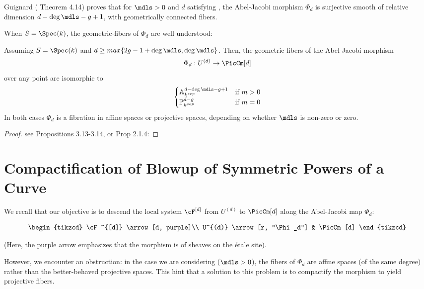 Guignard (\cite{Guignard2018} Theorem 4.14) proves that for $\mdls > 0$ and $d$ satisfying , the Abel-Jacobi morphism $\Phi_d$ is 
surjective smooth of relative dimension $d - \deg \mdls - g + 1$, with geometrically connected fibers. 

When $S=\Spec (k)$, the geometric-fibers of $\Phi_d$ are well understood:
\begin{theorem}
    Assuming $S=\Spec (k)$ and $d \geq max \{2g - 1 + \deg \mdls, \deg \mdls\}$. Then, the geometric-fibers of the Abel-Jacobi morphism $$ \Phi_d : U^{(d)} \to \PicCm[d] $$ over any point are isomorphic to
$$
\begin{cases}
\mathbb{A}_{k^{sep}}^{d - \deg \mdls - g + 1} & \text{if } m > 0 \\
\mathbb{P}_{k^{sep}}^{d - g} & \text{if } m = 0
\end{cases}
$$
In both cases $\Phi_d$ is a fibration in affine spaces or projective spaces, depending on whether $\mdls$ is non-zero or zero.
\end{theorem}
\begin{proof}
see \cite{tendler2015geometricclassfieldtheory} Propositions 3.13-3.14, or \cite{Toth2011} Prop 2.1.4:    

\end{proof}


\section{Compactification of Blowup of Symmetric Powers of a Curve}\label{section:BlowupOfSymmetricPowerOfCurves}
We recall that our objective is to descend the local system $\cF^{[d]}$ from $U^{(d)}$ to $\PicCm[d]$ along the 
Abel-Jacobi map $\Phi_d$:

\[
\begin{tikzcd}
 \cF^{[d]} \arrow[d, purple]\\
 U^{(d)} \arrow[r, "\Phi_d"] & \PicCm[d]      
\end{tikzcd}
\]


(Here, the purple arrow emphasizes that the morphism is of sheaves on the étale site).

However, we encounter an obstruction: in the case we are considering ($\mdls > 0$), 
the fibers of $\Phi_d$ are affine spaces (of the same degree) rather than the better-behaved projective spaces. 
This hint that a solution to this problem is to compactify the morphism to yield projective fibers. 
 
